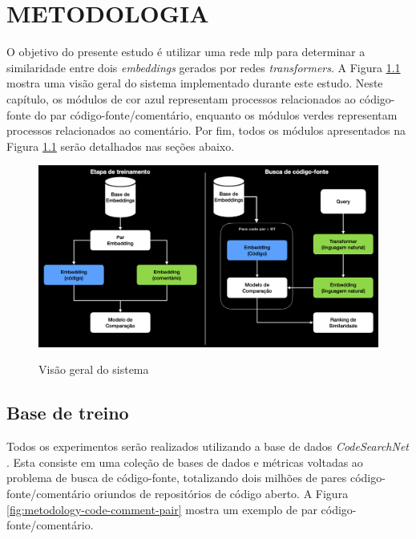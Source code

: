 \chapter{METODOLOGIA}
\label{chp:methodology}
\graphicspath{ {./imagens/metodologia} }

O objetivo do presente estudo é utilizar uma rede \gls{mlp} para determinar a similaridade entre dois \textit{embeddings} gerados por redes \textit{transformers}. A Figura \ref{fig:metodology-system_overview} mostra uma visão geral do sistema implementado durante este estudo. Neste capítulo, os módulos de cor azul representam processos relacionados ao código-fonte do par código-fonte/comentário, enquanto os módulos verdes representam processos relacionados ao comentário. Por fim, todos os módulos apresentados na Figura \ref{fig:metodology-system_overview} serão detalhados nas seções abaixo.

\begin{figure}[H]
    \centering
        \caption{Visão geral do sistema}
        \includegraphics[scale=0.3]{system-overview.png}
        \label{fig:metodology-system_overview}
\end{figure}

\section{Base de treino}
Todos os experimentos serão realizados utilizando a base de dados \textit{CodeSearchNet} \cite{Husain2019CodeSearchNetCE}. Esta consiste em uma coleção de bases de dados e métricas voltadas ao problema de busca de código-fonte, totalizando dois milhões de pares código-fonte/comentário oriundos de repositórios de código aberto. A Figura \ref{fig:metodology-code-comment-pair} mostra um exemplo de par código-fonte/comentário.

